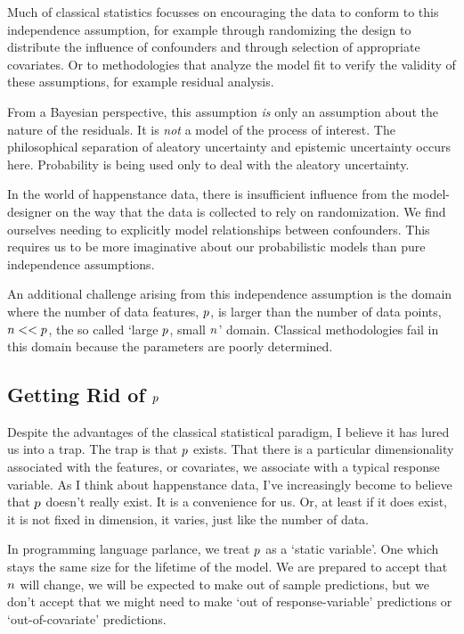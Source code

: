 \documentclass[a4paperpaper,]{article}
\begin{document}
Much of classical statistics focusses on encouraging the data to conform
to this independence assumption, for example through randomizing the
design to distribute the influence of confounders and through selection
of appropriate covariates. Or to methodologies that analyze the model
fit to verify the validity of these assumptions, for example residual
analysis.

From a Bayesian perspective, this assumption \emph{is} only an
assumption about the nature of the residuals. It is \emph{not} a model
of the process of interest. The philosophical separation of aleatory
uncertainty and epistemic uncertainty occurs here. Probability is being
used only to deal with the aleatory uncertainty.

In the world of happenstance data, there is insufficient influence from
the model-designer on the way that the data is collected to rely on
randomization. We find ourselves needing to explicitly model
relationships between confounders. This requires us to be more
imaginative about our probabilistic models than pure independence
assumptions.

An additional challenge arising from this independence assumption is the
domain where the number of data features, \(p\), is larger than
the number of data points, \(n<<p\), the so called `large
\(p\), small \(n\)' domain. Classical methodologies fail
in this domain because the parameters are poorly determined.

\hypertarget{getting-rid-of-datadim}{%
\subsection{\texorpdfstring{Getting Rid of
\(p\)}{Getting Rid of \textbackslash dataDim}}\label{getting-rid-of-datadim}}

Despite the advantages of the classical statistical paradigm, I believe
it has lured us into a trap. The trap is that \(p\) exists. That
there is a particular dimensionality associated with the features, or
covariates, we associate with a typical response variable. As I think
about happenstance data, I've increasingly become to believe that
\(p\) doesn't really exist. It is a convenience for us. Or, at
least if it does exist, it is not fixed in dimension, it varies, just
like the number of data.

In programming language parlance, we treat \(p\) as a `static
variable'. One which stays the same size for the lifetime of the model.
We are prepared to accept that \(n\) will change, we will be
expected to make out of sample predictions, but we don't accept that we
might need to make `out of response-variable' predictions or
`out-of-covariate' predictions.
\end{document}
